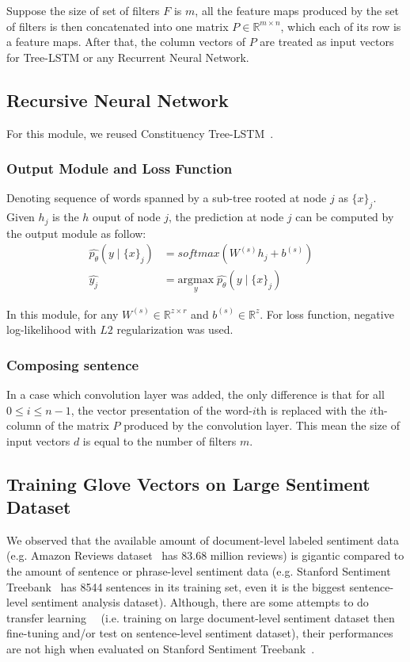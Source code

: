 Suppose the size of set of filters \(F\) is \(m\), all the feature maps produced by the set of filters is then concatenated into one matrix \(P \in \mathbb{R}^{m \times n}\), which each of its row is a feature maps.
After that, the column vectors of \(P\) are treated as input vectors for Tree-LSTM or any Recurrent Neural Network.
\subsection{Recursive Neural Network}
For this module, we reused Constituency Tree-LSTM~\cite{treeLSTM}.


\subsubsection{Output Module and Loss Function}
 Denoting sequence of words spanned by a sub-tree rooted at node \({j}\) as \({\{x\}_j}\).
Given \({h_j}\) is the \({h}\) ouput of node \({j}\), the prediction at node \({j}\) can be computed by the output module as follow:
\begin{align}
\hat{p_{\theta}}(y \mid \{x\}_j ) &= softmax( W^{(s)} h_j + b^{(s)}) & \\
\hat{y_j} &= \underset{y}{\mathrm{argmax}} \; \hat{p_{\theta}}(y \mid \{x\}_j ) &
\end{align}

In this module, for any \(W^{(s)} \in \mathbb{R}^{z \times r}\) and \( b^{(s)} \in \mathbb{R}^z\).
For loss function, negative log-likelihood with \(L2\) regularization was used.

\subsubsection{Composing sentence}
In a case which convolution layer was added, the only difference is that for all \(0 \leq i \leq n-1\), the vector presentation of the word-\(i\)th is replaced with the \(i\)th-column of the matrix \(P\) produced by the convolution layer.
This mean the size of input vectors \(d\) is equal to the number of filters \(m\).

\subsection{Training Glove Vectors on Large Sentiment Dataset}
We observed that the available amount of document-level labeled sentiment data (e.g. Amazon Reviews dataset~\cite{amazon-reviews} has 83.68 million reviews) is gigantic compared to the amount of sentence or phrase-level sentiment data (e.g. Stanford Sentiment Treebank~\cite{socher2013recursive} has 8544 sentences in its training set, even it is the biggest sentence-level sentiment analysis dataset).
Although, there are some attempts to do transfer learning~\cite{group-instance}~\cite{re-embedding} (i.e. training on large document-level sentiment dataset then fine-tuning and/or test on sentence-level sentiment dataset), their performances are not high when evaluated on Stanford Sentiment Treebank~\cite{group-instance}.


